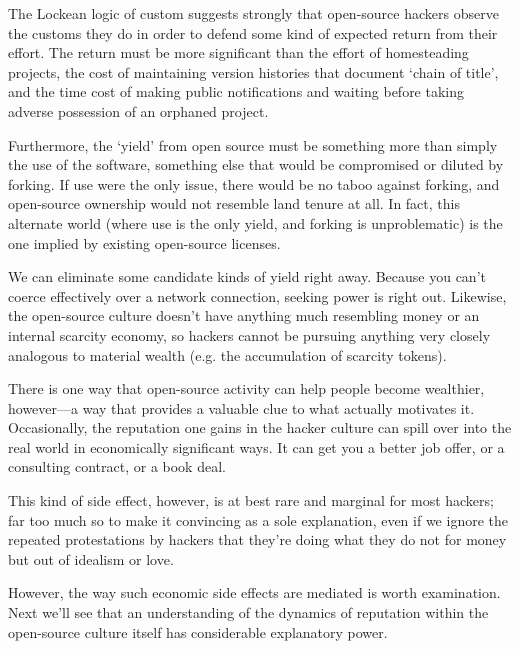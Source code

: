 The Lockean logic of custom suggests strongly that open-source hackers observe
the customs they do in order to defend some kind of expected return from their
effort.  The return must be more significant than the effort of homesteading
projects, the cost of maintaining version histories that document `chain of
title', and the time cost of making public notifications and waiting before
taking adverse possession of an orphaned project.

Furthermore, the `yield' from open source must be something more than simply the
use of the software, something else that would be compromised or diluted by
forking.  If use were the only issue, there would be no taboo against forking,
and open-source ownership would not resemble land tenure at all.  In fact, this
alternate world (where use is the only yield, and forking is unproblematic) is
the one implied by existing open-source licenses.

We can eliminate some candidate kinds of yield right away.  Because you can't
coerce effectively over a network connection, seeking power is right out.
Likewise, the open-source culture doesn't have anything much resembling money or
an internal scarcity economy, so hackers cannot be pursuing anything very
closely analogous to material wealth (e.g.  the accumulation of scarcity
tokens).

There is one way that open-source activity can help people become wealthier,
however—a way that provides a valuable clue to what actually motivates it.
Occasionally, the reputation one gains in the hacker culture can spill over into
the real world in economically significant ways.  It can get you a better job
offer, or a consulting contract, or a book deal.

This kind of side effect, however, is at best rare and marginal for most
hackers; far too much so to make it convincing as a sole explanation, even if we
ignore the repeated protestations by hackers that they're doing what they do not
for money but out of idealism or love.

However, the way such economic side effects are mediated is worth examination.
Next we'll see that an understanding of the dynamics of reputation within the
open-source culture itself has considerable explanatory power.
